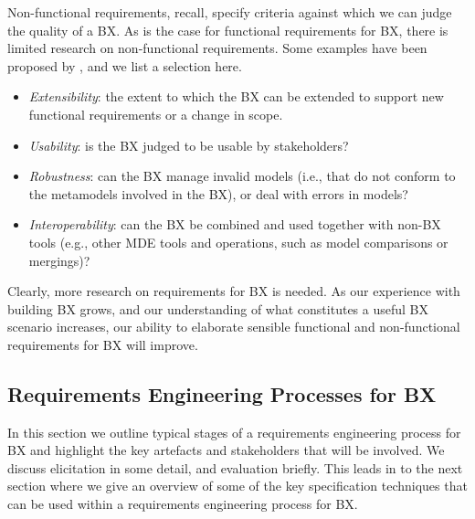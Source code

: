 Non-functional requirements, recall, specify criteria against which we can judge the quality of a BX. As is the case for functional requirements for BX, there is limited research on non-functional requirements. Some examples have been proposed by \cite{NalchigarSC13}, and we list a selection here.

\begin{itemize}
\item \textit{Extensibility}: the extent to which the BX can be extended to support new functional requirements  or a change in scope.

\item \textit{Usability}: is the BX judged to be usable by stakeholders?

\item \textit{Robustness}: can the BX manage invalid models (i.e., that do not conform to the metamodels involved in the BX), or deal with errors in models?

\item \textit{Interoperability}: can the BX be combined and used together with non-BX tools (e.g., other MDE tools and operations, such as model comparisons or mergings)?
\end{itemize}

Clearly, more research on requirements for BX is needed. As our experience with building BX grows, and our understanding of what constitutes a useful BX scenario increases, our ability to elaborate sensible functional and non-functional requirements for BX will improve.

\subsection{Requirements Engineering Processes for BX}
In this section we outline typical stages of a requirements engineering process for BX and highlight the key artefacts and stakeholders that will be involved. We discuss elicitation in some detail, and evaluation briefly. This leads in to the next section where we give an overview of some of the key specification techniques that can be used within a requirements engineering process for BX.

